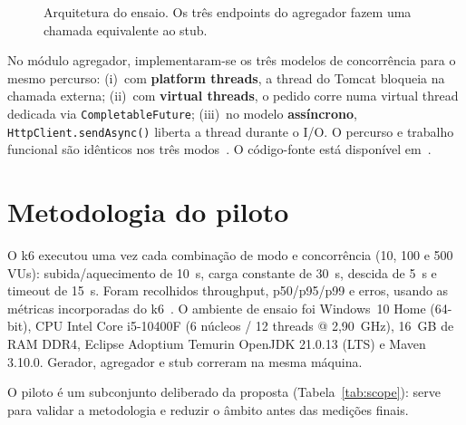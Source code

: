 \documentclass[sigplan]{acmart}
\begin{document}
\begin{figure}[t]
\centering
{}
\caption{Arquitetura do ensaio. Os três endpoints do agregador fazem uma chamada equivalente ao stub.}
\label{fig:architecture}
\end{figure}

No módulo agregador, implementaram-se os três modelos de concorrência para o mesmo percurso: (i)~com \textbf{platform threads}, a thread do Tomcat bloqueia na chamada externa; (ii)~com \textbf{virtual threads}, o pedido corre numa virtual thread dedicada via \texttt{CompletableFuture}; (iii)~no modelo \textbf{assíncrono}, \texttt{HttpClient.sendAsync()} liberta a thread durante o I/O. O percurso e trabalho funcional são idênticos nos três modos~\cite{jep444}. O código-fonte está disponível em~\cite{repogit}.

\section{Metodologia do piloto}
O k6 executou uma vez cada combinação de modo e concorrência (10, 100 e 500 VUs): subida/aquecimento de 10~s, carga constante de 30~s, descida de 5~s e timeout de 15~s. Foram recolhidos throughput, p50/p95/p99 e erros, usando as métricas incorporadas do k6~\cite{k6metrics}. O ambiente de ensaio foi Windows~10 Home (64-bit), CPU Intel Core i5-10400F (6 núcleos / 12 threads @ 2,90~GHz), 16~GB de RAM DDR4, Eclipse Adoptium Temurin OpenJDK 21.0.13 (LTS) e Maven 3.10.0. Gerador, agregador e stub correram na mesma máquina.

O piloto é um subconjunto deliberado da proposta (Tabela~\ref{tab:scope}): serve para validar a metodologia e reduzir o âmbito antes das medições finais.
\end{document}
